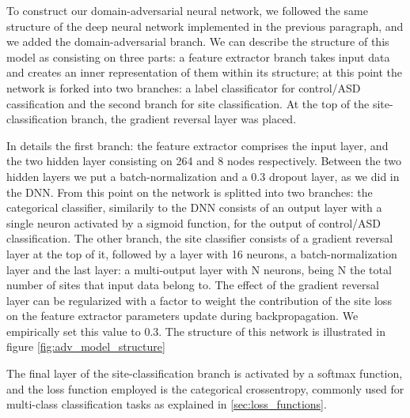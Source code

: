 \documentclass[11pt]{report}
\begin{document}

To construct our domain-adversarial neural network, we followed the same structure of the deep neural network implemented in the previous paragraph, and we added the domain-adversarial branch.
We can describe the structure of this model as consisting on three parts: a feature extractor branch takes input data and creates an inner representation of them within its structure; at this point the network is forked into two branches: a label classificator for control/ASD cassification and the second branch for site classification.
At the top of the site-classification branch, the gradient reversal layer was placed.

In details the first branch: the feature extractor comprises the input layer, and the two hidden layer consisting on 264 and 8 nodes respectively.
Between the two hidden layers we put a batch-normalization and a 0.3 dropout layer, as we did in the DNN.
From this point on the network is splitted into two branches: the categorical classifier, similarily to the DNN consists of an output layer with a single neuron activated by a sigmoid function, for the output of control/ASD classification.
The other branch, the site classifier consists of a gradient reversal layer at the top of it, followed by a layer with 16 neurons, a batch-normalization layer and the last layer: a multi-output layer with N neurons, being N the total number of sites that input data belong to.
The effect of the gradient reversal layer can be regularized with a factor to weight the contribution of the site loss on the feature extractor parameters update during backpropagation.
We empirically set this value to 0.3.
The structure of this network is illustrated in figure \ref{fig:adv_model_structure}

The final layer of the site-classification branch is activated by a softmax function, and the loss function employed is the categorical crossentropy, commonly used for multi-class classification tasks as explained in \ref{sec:loss_functions}.

\end{document}
